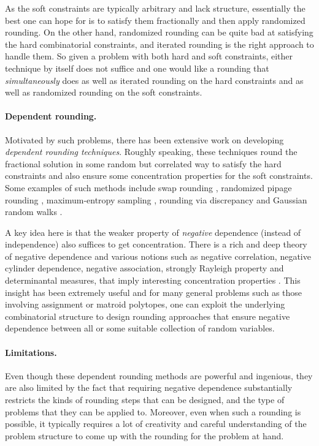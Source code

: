 \documentclass[11pt]{article}
\theoremstyle{definition}
\begin{document}
%

As the soft constraints are typically arbitrary and lack structure, essentially the best one can hope for is to satisfy them fractionally and then apply randomized rounding. On the other hand, randomized rounding can be quite bad at satisfying the hard combinatorial constraints, and iterated rounding is the right approach to handle them. So given a problem with both hard and soft constraints, either technique by itself does not suffice and one would like a rounding that \emph{simultaneously} does as well as iterated rounding on the hard constraints and as well as randomized rounding on the soft constraints.


\paragraph{Dependent rounding.}
Motivated by such problems, there has been extensive work on developing \emph{dependent rounding techniques}. Roughly speaking, these techniques round the fractional solution in some random but correlated way to satisfy the hard constraints and also ensure some concentration properties for the soft constraints.
Some examples of such methods include swap rounding \cite{CVZ10,CVZ11}, randomized pipage rounding \cite{AFK,Srin01,GKPS06,HO14},  maximum-entropy sampling \cite{AGMOS10,SV14,AS10},
rounding via discrepancy \cite{LM12, R12, BN16} and Gaussian random walks \cite{PSV17}.
%

A key idea here is that the weaker property of
\emph{negative} dependence (instead of independence) also suffices to get concentration. There is a rich and deep theory of
negative dependence and various notions such as negative correlation, negative cylinder dependence,
negative association, strongly Rayleigh property and determinantal measures, that imply interesting concentration properties \cite{Pem00, BBL09, DP09}.
This insight has been extremely useful and for many general problems such as those involving assignment or matroid polytopes, one can exploit the underlying combinatorial structure to design rounding approaches that ensure negative dependence between all or some  suitable collection of random variables.

\paragraph{Limitations.} Even though these dependent rounding methods are powerful and ingenious, they are also limited by the fact that requiring negative dependence substantially restricts the kinds of rounding steps that can be designed, and the type of problems that they can be applied to.
Moreover, even when such a rounding is possible, it typically requires a lot of creativity and careful understanding of the problem structure to come up with the rounding for the problem at hand.
\end{document}
